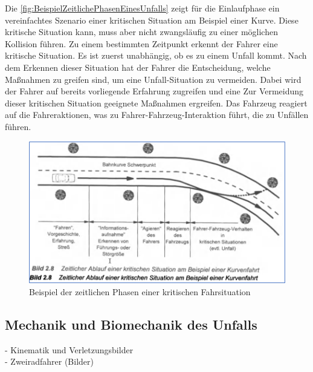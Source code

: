 Die \autoref{fig:BeispielZeitlichePhasenEinesUnfalls} zeigt für die Einlaufphase ein vereinfachtes Szenario einer kritischen Situation am Beispiel einer Kurve. Diese kritische Situation kann, muss aber nicht zwangsläufig zu einer möglichen Kollision führen. Zu einem bestimmten Zeitpunkt erkennt der Fahrer eine kritische Situation. Es ist zuerst unabhängig, ob es zu einem Unfall kommt. Nach dem Erkennen dieser Situation hat der Fahrer die Entscheidung, welche Maßnahmen zu greifen sind, um eine Unfall-Situation zu vermeiden. Dabei wird der Fahrer auf bereits vorliegende Erfahrung zugreifen und eine Zur Vermeidung dieser kritischen Situation geeignete Maßnahmen ergreifen. Das Fahrzeug reagiert auf die Fahreraktionen, was zu Fahrer-Fahrzeug-Interaktion führt, die zu Unfällen führen.\cite{Appel2002}\\


\begin{figure}[H]
	\centering
	\includegraphics[width=\linewidth]{Bilder/BeispielZeitlichePhasenEinesUnfalls.png}
	\caption{Beispiel der zeitlichen Phasen einer kritischen Fahrsituation \cite{Appel2002}}
	\label{fig:BeispielZeitlichePhasenEinesUnfalls}
\end{figure}

%
%
%
%
%
\subsection{Mechanik und Biomechanik des Unfalls}
- Kinematik und Verletzungsbilder\\
- Zweiradfahrer (Bilder)

